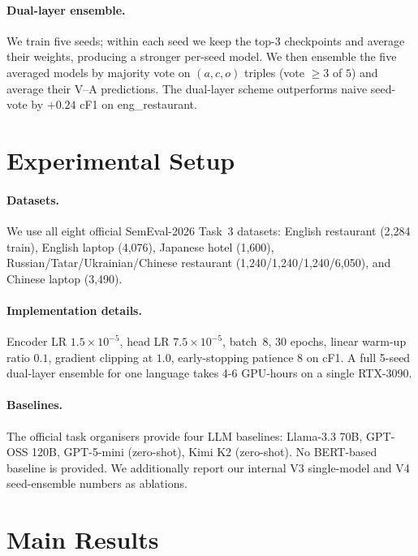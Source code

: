 \documentclass[11pt]{article}
\begin{document}
\paragraph{Dual-layer ensemble.}
We train five seeds; within each seed we keep the top-3 checkpoints
and average their weights, producing a stronger per-seed model. We
then ensemble the five averaged models by majority vote on
$(a, c, o)$ triples (vote $\geq 3$ of $5$) and average their V--A
predictions. The dual-layer scheme outperforms naive seed-vote by
$+0.24$ cF1 on eng\_restaurant.

\section{Experimental Setup}
\label{sec:setup}

\paragraph{Datasets.}
We use all eight official SemEval-2026 Task~3 datasets: English
restaurant (2{,}284 train), English laptop (4{,}076), Japanese hotel
(1{,}600), Russian/Tatar/Ukrainian/Chinese restaurant
(1{,}240/1{,}240/1{,}240/6{,}050), and Chinese laptop (3{,}490).

\paragraph{Implementation details.}
Encoder LR $1.5\times10^{-5}$, head LR $7.5\times10^{-5}$, batch~8,
30 epochs, linear warm-up ratio $0.1$, gradient clipping at $1.0$,
early-stopping patience 8 on cF1.
A full 5-seed dual-layer ensemble for one language takes 4-6 GPU-hours
on a single RTX-3090.

\paragraph{Baselines.}
The official task organisers provide four LLM baselines:
Llama-3.3 70B, GPT-OSS 120B, GPT-5-mini (zero-shot), Kimi K2
(zero-shot). No BERT-based baseline is provided. We additionally
report our internal V3 single-model and V4 seed-ensemble numbers as
ablations.

\section{Main Results}
\label{sec:results}
\end{document}
